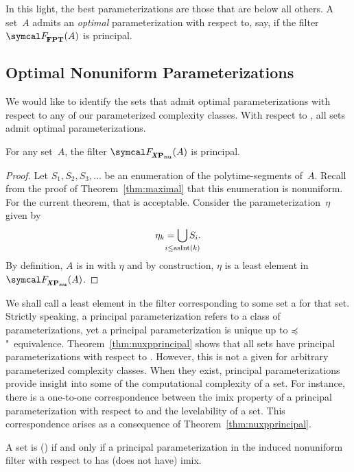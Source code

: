 In this light, the best parameterizations are those that are below all others.
A set~$A$ admits an \emph{optimal} parameterization with respect to, say,  if the filter $\calF_\cl{FPT}(A)$ is principal.

\subsection{Optimal Nonuniform Parameterizations}
\label{sec:tractability:optimalnu}%
We would like to identify the sets that admit optimal parameterizations with respect to any of our parameterized complexity classes.
With respect to , all sets admit optimal parameterizations.
\begin{theorem}
\label{thm:nuxpprincipal}%
  For any set~$A$, the filter $\calF_\clXnu{P}(A)$ is principal.
\end{theorem}
\begin{proof}
  Let $S_1, S_2, S_3, \ldots$ be an enumeration of the polytime-segments of~$A$.
  Recall from the proof of Theorem~\ref{thm:maximal} that this enumeration is nonuniform.
  For the current theorem, that is acceptable.
  Consider the parameterization~$\eta$ given by
  \begin{equation*}
    \eta_k \deq \bigcup_{\mathclap{i \le \asNat(k)}} S_i.
  \end{equation*}
  By definition, $A$ is in  with $\eta$ and by construction, $\eta$ is a least element in~$\calF_\clXnu{P}(A)$.
\end{proof}

We shall call a least element in the filter corresponding to some set a  for that set.
Strictly speaking, a principal parameterization refers to a class of parameterizations, yet a principal parameterization is unique up to $\preccurlyeq$"~equivalence.
Theorem~\ref{thm:nuxpprincipal} shows that all sets have principal parameterizations with respect to .
However, this is not a given for arbitrary parameterized complexity classes.
When they exist, principal parameterizations provide insight into some of the computational complexity of a set.
For instance, there is a one-to-one correspondence between the imix property of a principal parameterization with respect to  and the levelability of a set.
This correspondence arises as a consequence of Theorem~\ref{thm:nuxpprincipal}.
\begin{corollary}
  A set is  () if and only if a principal parameterization in the induced nonuniform filter with respect to  has (does not have) imix.
\end{corollary}

